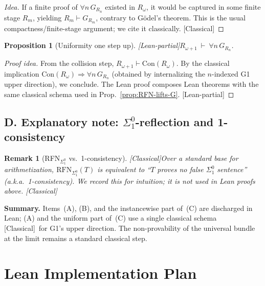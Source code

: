 \documentclass[11pt]{article}
\newtheorem{proposition}[theorem]{Proposition}
\newtheorem{remark}[theorem]{Remark}
\newcommand{\Con}{\mathrm{Con}}
\newcommand{\RFNSigOne}{\mathrm{RFN}_{\Sigma^0_1}}
\newcommand{\leancited}{\textsf{\textcolor{blue!70!black}{[Classical]}}}
\newcommand{\leanpartial}{\textsf{\textcolor{violet!70!black}{[Lean-partial]}}}
\begin{document}
\begin{proof}[Idea]
If a finite proof of $\forall n\,G_{R_n}$ existed in $R_\omega$, it would be
captured in some finite stage $R_m$, yielding $R_m\vdash G_{R_m}$, contrary
to Gödel's theorem. This is the usual compactness/finite-stage argument;
we cite it classically. \leancited
\end{proof}

\begin{proposition}[Uniformity one step up]\label{prop:limit-uniform-omega+1} 
\leanpartial\quad $R_{\omega+1}\ \vdash\ \forall n\,G_{R_n}$.
\end{proposition}

\begin{proof}[Proof idea]
From the collision step, $R_{\omega+1}\vdash \Con(R_\omega)$.
By the classical implication $\Con(R_\omega)\Rightarrow \forall n\,G_{R_n}$
(obtained by internalizing the $n$-indexed G1 upper direction),
we conclude. The Lean proof composes Lean theorems with the same classical
schema used in Prop.~\ref{prop:RFN-lifts-G}. \leanpartial
\end{proof}

\subsection{D. Explanatory note: $\Sigma^0_1$-reflection and 1-consistency} 

\begin{remark}[RFN${}_{\Sigma^0_1}$ vs.\ 1-consistency]
\leancited\quad Over a standard base for arithmetization, $\RFNSigOne(T)$ is equivalent to
``$T$ proves no false $\Sigma^0_1$ sentence'' (a.k.a.\ 1-consistency).
We record this for intuition; it is not used in Lean proofs above. \leancited
\end{remark}

\medskip
\noindent\textbf{Summary.} Items~(A), (B), and the instancewise part of~(C)
are discharged in Lean; (A) and the uniform part of~(C) use a single
classical schema \leancited\ for G1's upper direction. The non-provability
of the universal bundle at the limit remains a standard classical step.


\section{Lean Implementation Plan}
\end{document}
